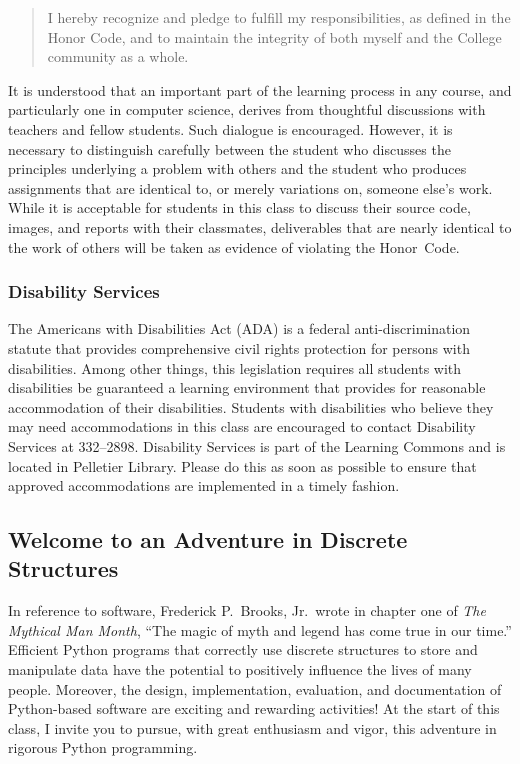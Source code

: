 \documentclass[11pt]{article}
\begin{document}
\vspace*{-.05in}
%
\begin{quote}
%
  I hereby recognize and pledge to fulfill my responsibilities, as defined in
  the Honor Code, and to maintain the integrity of both myself and the College
  community as a whole.
%
\end{quote}
%
\vspace*{-.075in}

\noindent It is understood that an important part of the learning process in any
course, and particularly one in computer science, derives from thoughtful
discussions with teachers and fellow students. Such dialogue is encouraged.
However, it is necessary to distinguish carefully between the student who
discusses the principles underlying a problem with others and the student who
produces assignments that are identical to, or merely variations on, someone
else's work. While it is acceptable for students in this class to discuss their
source code, images, and reports with their classmates, deliverables that are
nearly identical to the work of others will be taken as evidence of violating
the \mbox{Honor Code}.

\vspace*{-.1in}

\subsubsection*{Disability Services}

The Americans with Disabilities Act (ADA) is a federal anti-discrimination
statute that provides comprehensive civil rights protection for persons with
disabilities. Among other things, this legislation requires all students with
disabilities be guaranteed a learning environment that provides for reasonable
accommodation of their disabilities. Students with disabilities who believe they
may need accommodations in this class are encouraged to contact Disability
Services at 332--2898. Disability Services is part of the Learning Commons and
is located in Pelletier Library. Please do this as soon as possible to ensure
that approved accommodations are implemented in a timely fashion.

\vspace*{-.05in}

\subsection*{Welcome to an Adventure in Discrete Structures}

In reference to software, Frederick P.\ Brooks, Jr.\ wrote in chapter one of
{\em The Mythical Man Month}, ``The magic of myth and legend has come true in
our time.'' Efficient Python programs that correctly use discrete structures to
store and manipulate data have the potential to positively influence the lives
of many people. Moreover, the design, implementation, evaluation, and
documentation of Python-based software are exciting and rewarding activities!
At the start of this class, I invite you to pursue, with great enthusiasm and
vigor, this adventure in rigorous Python programming.
\end{document}
